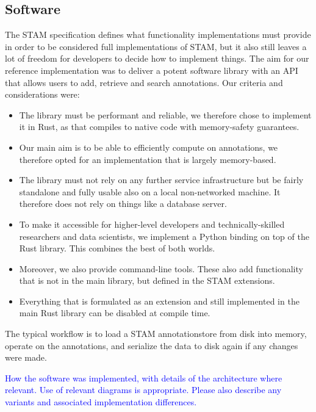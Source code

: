 \documentclass{jors}
\begin{document}
\subsection*{Software}

The STAM specification defines what functionality implementations must provide
in order to be considered full implementations of STAM, but it also still
leaves a lot of freedom for developers to decide how to implement things.  The
aim for our reference implementation was to deliver a potent software library
with an API that allows users to add, retrieve and search annotations. Our
criteria and considerations were:

\begin{itemize}
    \item The library must be performant and reliable, we therefore chose to implement it in Rust, as that compiles to native code with memory-safety guarantees.
    \item Our main aim is to be able to efficiently compute on annotations, we therefore opted for an implementation that is largely memory-based.
    \item The library must not rely on any further service infrastructure but be fairly standalone and fully usable also on a local non-networked machine. It therefore does not rely on things like a database server.
    \item To make it accessible for higher-level developers and technically-skilled researchers and data scientists, we implement a Python binding on top of the Rust library. This combines the best of both worlds.
    \item Moreover, we also provide command-line tools. These also add functionality that is not in the main library, but defined in the STAM extensions.
    \item Everything that is formulated as an extension and still implemented in the main Rust library can be disabled at compile time.
\end{itemize}

The typical workflow is to load a STAM annotationstore from disk into memory, operate on
the annotations, and serialize the data to disk again if any changes were made.



\textcolor{blue}{How the software was implemented, with details of the
architecture where relevant. Use of relevant diagrams is appropriate. Please
also describe any variants and associated implementation differences.}
\end{document}
